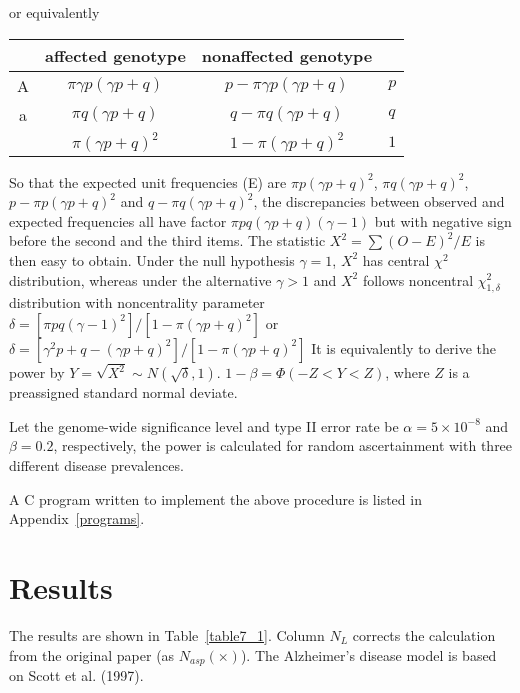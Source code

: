 \medskip or equivalently\medskip

\begin{center}\begin{tabular}{c|cc|l}
& affected genotype & nonaffected genotype \\ \hline
A & $\pi\gamma p(\gamma p+q)$ & $p-\pi\gamma p(\gamma p+q)$  & $p$ \\
a & $\pi q(\gamma p+q)$ & $q-\pi q(\gamma p+q)$ & $q$\\ \hline
  & $\pi(\gamma p+q)^2$ & $1-\pi(\gamma p+q)^2$ & $1$\\
\end{tabular}\end{center} \medskip

So that the expected unit frequencies (E) are $\pi p(\gamma p+q)^2$, $\pi
q(\gamma p+q)^2$, $p-\pi p(\gamma p+q)^2$ and $q-\pi q(\gamma p+q)^2$, the
discrepancies between observed and expected frequencies all have factor $\pi
pq(\gamma p+q)(\gamma-1)$ but with negative sign before the second and the
third items.  The statistic $X^2=\sum (O-E)^2/E$ is then easy to obtain.  Under
the null hypothesis $\gamma=1$, $X^2$ has central $\chi^2$ distribution,
whereas under the alternative $\gamma>1$ and $X^2$ follows noncentral
$\chi_{1,\delta}^2$ distribution with noncentrality parameter $\delta=[\pi
pq(\gamma-1)^2]/[1-\pi (\gamma p+q)^2]$ or $\delta=[\gamma^2 p+q-(\gamma
p+q)^2]/[1-\pi (\gamma p+q)^2]$ It is equivalently to derive the power by
$Y=\sqrt{X^2}\sim N(\sqrt{\delta},1)$.  $1-\beta=\Phi(-Z<Y<Z)$, where $Z$ is
a preassigned standard normal deviate.

Let the genome-wide significance level and type II error rate be
$\alpha=5\times 10^{-8}$ and $\beta=0.2$, respectively, the power is calculated
for random ascertainment with three different disease prevalences.

A C program written to implement the above procedure is listed in
Appendix~\ref{programs}.


\section{Results}

The results are shown in Table~\ref{table7_1}.  Column $N_L$ corrects the
calculation from the original paper (as $N_{asp}(\times)$).  The Alzheimer's
disease model is based on Scott et al.  (1997).


